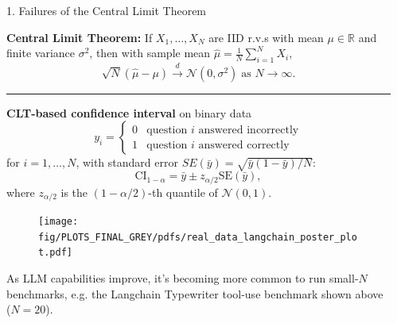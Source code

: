 \documentclass[final]{beamer}
\newlength{\sepwidth}
\newlength{\colwidth}
\newcommand{\separatorcolumn}{\begin{column}{\sepwidth}\end{column}}
\begin{document}
\begin{frame}[fragile]
\begin{columns}[t]
\separatorcolumn

\begin{column}{\colwidth}

  \begin{exampleblock}{1. Failures of the Central Limit Theorem}

    \textbf{Central Limit Theorem:}
    If $X_1, \ldots, X_N$ are IID r.v.s with mean $\mu \in \mathbb{R}$ and finite variance $\sigma^2$, then with sample mean $\hat{\mu} = \frac{1}{N}\sum_{i=1}^N X_i$,
    $$\sqrt{N} (\hat{\mu} - \mu) \xrightarrow{d} \mathcal{N} \left( 0, \sigma^2 \right) \; \text{as } N \rightarrow \infty.$$

    \begin{center}
      \rule{0.8\textwidth}{0.4pt}
    \end{center}

    \textbf{CLT-based confidence interval} on binary data 
    $$ y_i = \begin{cases} 0 & \text{question } i \text{ answered incorrectly} \\ 1 & \text{question } i \text{ answered correctly} \end{cases} $$
    for $i=1,\ldots,N$, with standard error $SE(\bar{y}) = \sqrt{\bar{y}(1-\bar{y})/N}$:
    $$
    \text{CI}_{1-\alpha} = \bar{y} \pm z_{\alpha/2} \text{SE}(\bar{y}),
    $$
    where $z_{\alpha/2}$ is the $(1-\alpha/2)$-th quantile of $\mathcal{N}(0, 1)$.

    \begin{figure}
      \centering
      \texttt{[image: fig/PLOTS\_FINAL\_GREY/pdfs/real\_data\_langchain\_poster\_plot.pdf]}
    \end{figure}

    As LLM capabilities improve, it's becoming more common to run small-$N$ benchmarks, e.g. the Langchain Typewriter tool-use benchmark shown above ($N=20$).
    

\end{exampleblock}
\end{column}
\end{columns}
\end{frame}
\end{document}
